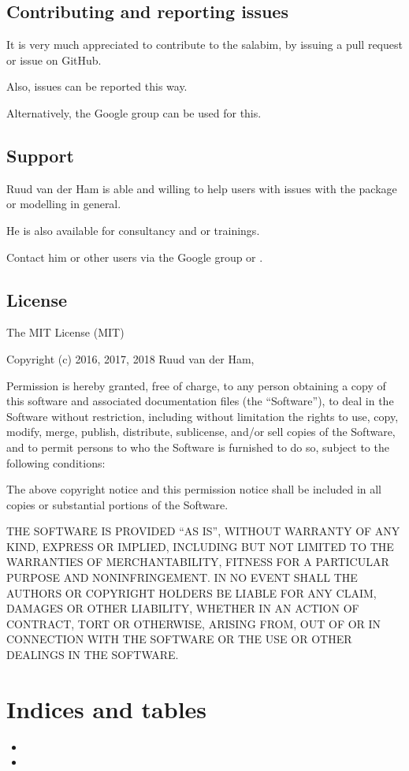 \documentclass[letterpaper,10pt,english]{sphinxmanual}
\begin{document}
\section{Contributing and reporting issues}
\label{\detokenize{About:contributing-and-reporting-issues}}
It is very much appreciated to contribute to the salabim, by issuing a pull request or issue on GitHub.

Also, issues can be reported this way.

Alternatively, the Google group can be used for this.


\section{Support}
\label{\detokenize{About:support}}
Ruud van der Ham is able and willing to help users with issues with the package or modelling in general.

He is also available for consultancy and or trainings.

Contact him or other users via the Google group or .


\section{License}
\label{\detokenize{About:license}}
The MIT License (MIT)

Copyright (c) 2016, 2017, 2018 Ruud van der Ham, 

Permission is hereby granted, free of charge, to any person obtaining a copy of
this software and associated documentation files (the “Software”), to deal in
the Software without restriction, including without limitation the rights to
use, copy, modify, merge, publish, distribute, sublicense, and/or sell copies
of the Software, and to permit persons to who the Software is furnished to do
so, subject to the following conditions:

The above copyright notice and this permission notice shall be included in all
copies or substantial portions of the Software.

THE SOFTWARE IS PROVIDED “AS IS”, WITHOUT WARRANTY OF ANY KIND, EXPRESS OR
IMPLIED, INCLUDING BUT NOT LIMITED TO THE WARRANTIES OF MERCHANTABILITY,
FITNESS FOR A PARTICULAR PURPOSE AND NONINFRINGEMENT. IN NO EVENT SHALL THE
AUTHORS OR COPYRIGHT HOLDERS BE LIABLE FOR ANY CLAIM, DAMAGES OR OTHER
LIABILITY, WHETHER IN AN ACTION OF CONTRACT, TORT OR OTHERWISE, ARISING FROM,
OUT OF OR IN CONNECTION WITH THE SOFTWARE OR THE USE OR OTHER DEALINGS IN THE
SOFTWARE.


\chapter{Indices and tables}
\label{\detokenize{Indices::doc}}\label{\detokenize{Indices:indices-and-tables}}\begin{itemize}
\item {} 

\item {} 

\end{itemize}



\renewcommand{\indexname}{Index}
\printindex
\end{document}
